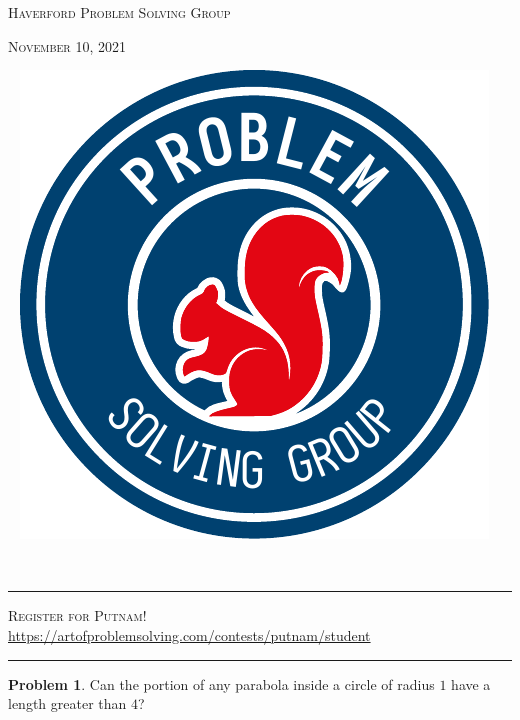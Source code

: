 \documentclass{scrartcl}
\theoremstyle{definition}
\newtheorem{prob}{Problem}
\begin{document}
	\noindent\begin{minipage}{.5\textwidth}{}
		\textsc{Haverford Problem Solving Group}

		\textsc{November 10, 2021}
	\end{minipage}\hfill
	\begin{minipage}{.4\textwidth}{}
		\ \hfill
		\includegraphics[height = .9in]{psg_logo}
	\end{minipage}\\[.5em] %
	\hrule\vspace{-1em}
	\begin{center}
		\textsc{Register for Putnam!}\\
		{\footnotesize \url{https://artofproblemsolving.com/contests/putnam/student}}\\[.5em]
	\end{center}
	\hrule


	\setcounter{prob}{5}
	\begin{prob}
		Can the portion of any parabola inside a circle of radius \(1\) have a length greater than \(4\)?
	\end{prob}

	\setcounter{prob}{9}
\end{document}
